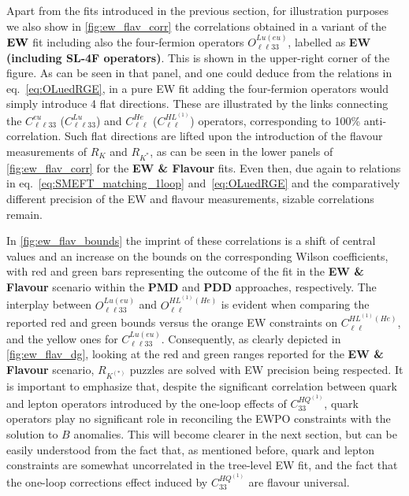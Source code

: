 Apart from the fits introduced in the previous section, for illustration purposes we also show in \autoref{fig:ew_flav_corr} the correlations obtained in a variant of the ${\bf EW}$ fit including also the four-fermion operators $O^{Lu(eu)}_{\ell\ell33}$, labelled as {\bf EW (including SL-4F operators)}. 
This is shown in the upper-right corner of the figure. As can be seen in that panel, and one could deduce from the relations in eq.~\eqref{eq:OLuedRGE}, in a pure EW fit adding the four-fermion operators would simply introduce 4 flat directions. These are illustrated by the links connecting the $C^{eu}_{\ell\ell 33}$ ($C^{Lu}_{\ell\ell 33}$) and $C^{He}_{\ell\ell}$ ($C^{HL^{(1)}}_{\ell\ell}$) operators, corresponding to 100\% anti-correlation.
Such flat directions are lifted upon the introduction of the flavour measurements of $R_{K}$ and $R_{K^*}$, as can be seen in the lower panels of \autoref{fig:ew_flav_corr} for the {\bf EW \& Flavour} fits.
%
Even then, due again to relations in eq.~\eqref{eq:SMEFT_matching_1loop} and~\eqref{eq:OLuedRGE} and the comparatively different precision of the EW and flavour measurements, sizable correlations remain. 

In \autoref{fig:ew_flav_bounds} the imprint of these correlations is a shift of central values and an increase on the bounds on the corresponding Wilson coefficients, with red and green bars representing the outcome of the fit in the {\bf EW \& Flavour} scenario within the {\bf PMD} and {\bf PDD} approaches, respectively. The interplay between $O^{Lu(eu)}_{\ell\ell33}$ and $O^{HL^{(1)}(He)}_{\ell\ell}$ is evident when comparing the reported red and green bounds versus the orange EW constraints on $C^{HL^{(1)}(He)}_{\ell\ell}$, and the yellow ones for $C^{Lu(eu)}_{\ell\ell33}$. Consequently, as clearly depicted in \autoref{fig:ew_flav_dg}, looking at the red and green ranges reported for the {\bf EW \& Flavour} scenario, $R_{K^{(*)}}$ puzzles are solved with EW precision being respected. It is important to emphasize that, despite the significant correlation between quark and lepton operators introduced by the one-loop effects of $C_{33}^{HQ^{(1)}}$, quark operators play no significant role in reconciling the EWPO constraints with the solution to $B$ anomalies. This will become clearer in the next section, but can be easily understood from the fact that, as mentioned before, quark and lepton constraints are somewhat uncorrelated in the tree-level EW fit, and the fact that the one-loop corrections effect induced by $C_{33}^{HQ^{(1)}}$ are flavour universal.


